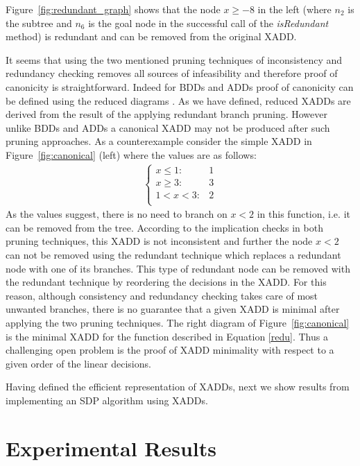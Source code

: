 \documentclass[twoside,11pt]{article}
\begin{document}
Figure~\ref{fig:redundant_graph} shows that the node $x\geq -8$ in the left (where $n_2$ is the subtree and $n_6$ is the goal node in the successful call of the \emph{isRedundant} method) is redundant and can be removed from the original XADD. 

It seems that using the two mentioned pruning techniques of inconsistency and redundancy checking removes all sources of infeasibility and therefore proof of canonicity is straightforward. Indeed for BDDs and ADDs proof of canonicity can be defined using the reduced diagrams \cite{bryant}. 
As we have defined, reduced XADDs are derived from the result of the applying redundant branch pruning.  However unlike BDDs and ADDs a canonical XADD may not be produced after such pruning approaches. As a counterexample consider the simple XADD in  Figure~\ref{fig:canonical} (left) where the values are as follows: 
\begin{align}
\label{redu}
	\begin{cases}
		x \leq 1 :& 1  \\
		x \geq 3 :&3\\
		1<x<3 :& 2\\
	\end{cases}
\end{align}
As the values suggest, there is no need to branch on $x<2$ in this function, i.e. it can be removed from the tree. According to the implication checks in both pruning techniques, this XADD is not inconsistent and further the node $x<2$ can not be removed using the redundant technique which replaces a redundant node with one of its branches. This type of redundant node can be removed with the redundant technique by reordering the decisions in the XADD. For this reason, although consistency and redundancy checking takes care of most unwanted branches, there is no guarantee that a given XADD is minimal after applying the two pruning techniques. The right diagram of Figure~\ref{fig:canonical} is the minimal XADD  for the function described in Equation \ref{redu}. Thus a challenging open problem is the proof of XADD minimality with respect to a given order of the linear decisions. 

Having defined the efficient representation of XADDs, next we show results from implementing an SDP algorithm using XADDs.

\section{Experimental Results} \label{results}
\end{document}
